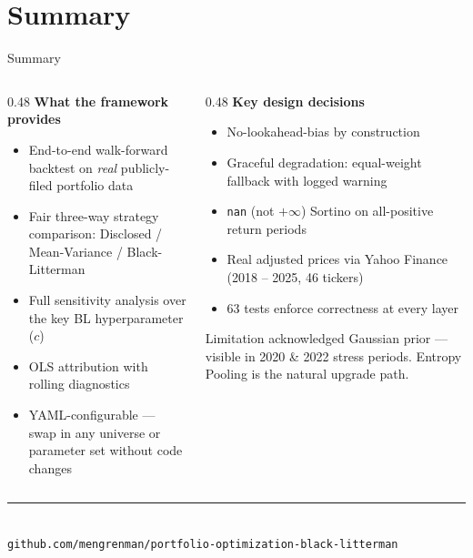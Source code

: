 \documentclass[aspectratio=169, 10pt]{beamer}
\begin{document}
\section{Summary}

\begin{frame}{Summary}

  \begin{columns}[T]
    \begin{column}{0.48\textwidth}
      \textbf{What the framework provides}
      \begin{itemize}
        \item End-to-end walk-forward backtest on \emph{real}
              publicly-filed portfolio data
        \item Fair three-way strategy comparison:
              Disclosed / Mean-Variance / Black-Litterman
        \item Full sensitivity analysis over the key
              BL hyperparameter ($c$)
        \item OLS attribution with rolling diagnostics
        \item YAML-configurable — swap in any universe
              or parameter set without code changes
      \end{itemize}
    \end{column}

    \begin{column}{0.48\textwidth}
      \textbf{Key design decisions}
      \begin{itemize}
        \item No-lookahead-bias by construction
        \item Graceful degradation: equal-weight fallback
              with logged warning
        \item \texttt{nan} (not $+\infty$) Sortino on
              all-positive return periods
        \item Real adjusted prices via Yahoo Finance
              (2018 – 2025, 46 tickers)
        \item 63 tests enforce correctness at every layer
      \end{itemize}

      \bigskip
      \begin{block}{Limitation acknowledged}
        \small
        Gaussian prior — visible in 2020 \& 2022 stress
        periods. Entropy Pooling is the natural upgrade path.
      \end{block}
    \end{column}
  \end{columns}

  \vfill
  \begin{center}
    \textcolor{blnavy!60}{\rule{0.8\textwidth}{0.4pt}}\\[4pt]
    \small\textcolor{blnavy!70}{
      \texttt{github.com/mengrenman/portfolio-optimization-black-litterman}}
  \end{center}
\end{frame}

\end{document}
